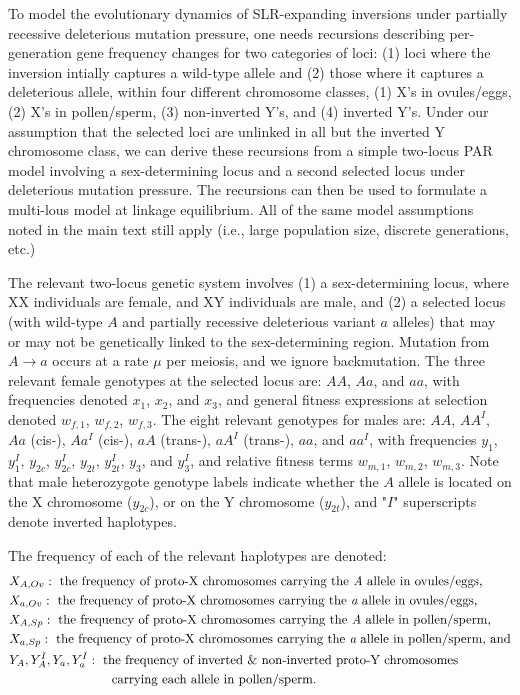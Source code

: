 \documentclass{article}
\begin{document}
\begin{appendices}
To model the evolutionary dynamics of SLR-expanding inversions under partially recessive deleterious mutation pressure, one needs recursions describing per-generation gene frequency changes for two categories of loci: (1) loci where the inversion intially captures a wild-type allele and (2) those where it captures a deleterious allele, within four different chromosome classes, (1) X's in ovules/eggs, (2) X's in pollen/sperm, (3) non-inverted Y's, and (4) inverted Y's. Under our assumption that the selected loci are unlinked in all but the inverted Y chromosome class, we can derive these recursions from a simple two-locus PAR model involving a sex-determining locus and a second selected locus under deleterious mutation pressure. The recursions can then be used to formulate a multi-lous model at linkage equilibrium. All of the same model assumptions noted in the main text still apply (i.e., large population size, discrete generations, etc.)

The relevant two-locus genetic system involves (1) a sex-determining locus, where XX individuals are female, and XY individuals are male, and (2) a selected locus (with wild-type $A$ and partially recessive deleterious variant $a$ alleles) that may or may not be genetically linked to the sex-determining region. Mutation from $A \rightarrow a$ occurs at a rate $\mu$ per meiosis, and we ignore backmutation. The three relevant female genotypes at the selected locus are: $AA$, $Aa$, and $aa$, with frequencies denoted $x_1$, $x_2$, and $x_3$, and general fitness expressions at selection denoted $w_{f,1}$, $w_{f,2}$, $w_{f,3}$. The eight relevant genotypes for males are: $AA$, $AA^I$, $Aa$ (cis-), $Aa^I$ (cis-), $aA$ (trans-), $aA^I$ (trans-), $aa$, and $aa^I$, with frequencies $y_{1}$, $y^I_{1}$, $y_{2c}$, $y^I_{2c}$, $y_{2t}$, $y^I_{2t}$, $y_{3}$, and $y^I_{3}$, and relative fitness terms $w_{m,1}$, $w_{m,2}$, $w_{m,3}$. Note that male heterozygote genotype labels indicate whether the $A$ allele is located on the X chromosome ($y_{2c}$), or on the Y chromosome ($y_{2t}$), and "$I$" superscripts denote inverted haplotypes. 

The frequency of each of the relevant haplotypes are denoted: 
\begin{align*}
	&X_{A,Ov}:~\text{the frequency of proto-X chromosomes carrying the {\itshape A} allele in ovules/eggs,}\\ 
	&X_{a,Ov}:~\text{the frequency of proto-X chromosomes carrying the {\itshape a} allele in ovules/eggs,}\\ 
	&X_{A,Sp}:~\text{the frequency of proto-X chromosomes carrying the {\itshape A} allele in pollen/sperm,}\\ 
	&X_{a,Sp}:~\text{the frequency of proto-X chromosomes carrying the {\itshape a} allele in pollen/sperm, and}\\ 
	&Y_A, Y_A^{I}, Y_a, Y_a^{I}:~\text{the frequency of inverted \& non-inverted proto-Y chromosomes}\\ &~~~~~~~~~~~~~~~~~~~~~~~~\text{carrying each allele in pollen/sperm.}
\end{align*}


\end{appendices}
\end{document}
